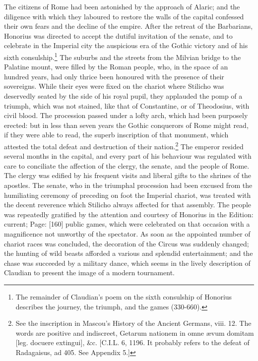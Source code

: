 The citizens of Rome had been astonished by the approach of Alaric; and the diligence with which they laboured to restore the walls of the capital confessed their own fears and the decline of the empire. After the retreat of the Barbarians, Honorius was directed to accept the dutiful invitation of the senate, and to celebrate in the Imperial city the auspicious era of the Gothic victory and of his sixth consulship.\footnote{The remainder of Claudian\texthebrew{}’s poem on the sixth consulship of Honorius describes the journey, the triumph, and the games (330-660).} The suburbs and the streets from the Milvian bridge to the Palatine mount, were filled by the Roman people, who, in the space of an hundred years, had only thrice been honoured with the presence of their sovereigns. While their eyes were fixed on the chariot where Stilicho was deservedly seated by the side of his royal pupil, they applauded the pomp of a triumph, which was not stained, like that of Constantine, or of Theodosius, with civil blood. The procession passed under a lofty arch, which had been purposely erected: but in less than seven years the Gothic conquerors of Rome might read, if they were able to read, the superb inscription of that monument, which attested the total defeat and destruction of their nation.\footnote{See the inscription in Mascou\texthebrew{}’s History of the Ancient Germans, viii. 12. The words are positive and indiscreet, Getarum nationem in omne ævum domitam [leg. docuere extingui], \&c. [C.I.L. 6, 1196. It probably refers to the defeat of Radagaisus, ad 405. See Appendix 5.]} The emperor resided several months in the capital, and every part of his behaviour was regulated with care to conciliate the affection of the clergy, the senate, and the people of Rome. The clergy was edified by his frequent visits and liberal gifts to the shrines of the apostles. The senate, who in the triumphal procession had been excused from the humiliating ceremony of preceding on foot the Imperial chariot, was treated with the decent reverence which Stilicho always affected for that assembly. The people was repeatedly gratified by the attention and courtesy of Honorius in the Edition: current; Page: [160] public games, which were celebrated on that occasion with a magnificence not unworthy of the spectator. As soon as the appointed number of chariot races was concluded, the decoration of the Circus was suddenly changed; the hunting of wild beasts afforded a various and splendid entertainment; and the chase was succeeded by a military dance, which seems in the lively description of Claudian to present the image of a modern tournament.

